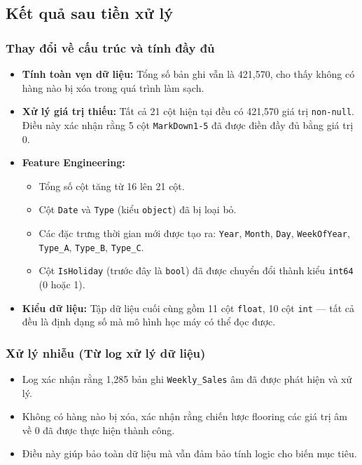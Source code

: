 \subsection{Kết quả sau tiền xử lý}

\subsubsection{Thay đổi về cấu trúc và tính đầy đủ}

\begin{itemize}
    \item \textbf{Tính toàn vẹn dữ liệu:} Tổng số bản ghi vẫn là 421{,}570, cho thấy không có hàng nào bị xóa trong quá trình làm sạch.
    \item \textbf{Xử lý giá trị thiếu:} Tất cả 21 cột hiện tại đều có 421{,}570 giá trị \texttt{non-null}. Điều này xác nhận rằng 5 cột \texttt{MarkDown1-5} đã được điền đầy đủ bằng giá trị 0.
    \item \textbf{Feature Engineering:} 
    \begin{itemize}
        \item Tổng số cột tăng từ 16 lên 21 cột.
        \item Cột \texttt{Date} và \texttt{Type} (kiểu \texttt{object}) đã bị loại bỏ.
        \item Các đặc trưng thời gian mới được tạo ra: \texttt{Year}, \texttt{Month}, \texttt{Day}, \texttt{WeekOfYear}, \texttt{Type\_A}, \texttt{Type\_B}, \texttt{Type\_C}.
        \item Cột \texttt{IsHoliday} (trước đây là \texttt{bool}) đã được chuyển đổi thành kiểu \texttt{int64} (0 hoặc 1).
    \end{itemize}
    \item \textbf{Kiểu dữ liệu:} Tập dữ liệu cuối cùng gồm 11 cột \texttt{float}, 10 cột \texttt{int} — tất cả đều là định dạng số mà mô hình học máy có thể đọc được.
\end{itemize}

\subsubsection{Xử lý nhiễu (Từ log xử lý dữ liệu)}

\begin{itemize}
    \item Log xác nhận rằng 1{,}285 bản ghi \texttt{Weekly\_Sales} âm đã được phát hiện và xử lý.
    \item Không có hàng nào bị xóa, xác nhận rằng chiến lược flooring các giá trị âm về 0 đã được thực hiện thành công.
    \item Điều này giúp bảo toàn dữ liệu mà vẫn đảm bảo tính logic cho biến mục tiêu.
\end{itemize}

